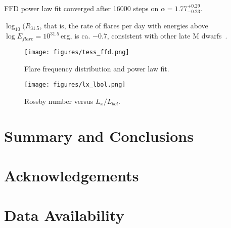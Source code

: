 \documentclass[twocolumn]{aastex631}
\begin{document}
FFD power law fit converged after 16000 steps on $\alpha = 1.77_{-0.23}^{+0.29}$.

$\log_10(R_{31.5}$, that is, the rate of flares per day with energies above $\log E_{flare}=10^{31.5}\,$erg, is ca. $-0.7$, consistent with other late M dwarfs~\citep{medina2022galactic}.


\begin{figure}
    \begin{centering}
        \texttt{[image: figures/tess\_ffd.png]}
        \caption{
         Flare frequency distribution and power law fit.
        }
        \label{fig:ffd}
    \end{centering}
\end{figure}

\begin{figure}[ht!]
    \begin{centering}
        \texttt{[image: figures/lx\_lbol.png]}
        \caption{
         Rossby number versus $L_x/L_{bol}$.
        }
        \label{fig:lxlbol}
    \end{centering}
\end{figure}


\section{Summary and Conclusions}


\section{Acknowledgements}
\citep{lightkurvecollaboration2018lightkurve}

\section{Data Availability}



\end{document}
